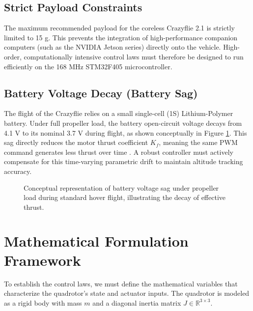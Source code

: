 \subsection{Strict Payload Constraints}
The maximum recommended payload for the coreless Crazyflie 2.1 is strictly limited to 15 g. This prevents the integration of high-performance companion computers (such as the NVIDIA Jetson series) directly onto the vehicle. High-order, computationally intensive control laws must therefore be designed to run efficiently on the 168 MHz STM32F405 microcontroller.

\subsection{Battery Voltage Decay (Battery Sag)}
The flight of the Crazyflie relies on a small single-cell (1S) Lithium-Polymer battery. Under full propeller load, the battery open-circuit voltage decays from 4.1 V to its nominal 3.7 V during flight, as shown conceptually in Figure \ref{fig:battery_sag_response}. This sag directly reduces the motor thrust coefficient $K_f$, meaning the same PWM command generates less thrust over time \cite{ref_40}. A robust controller must actively compensate for this time-varying parametric drift to maintain altitude tracking accuracy.

\begin{figure}[h!]
\centering
{}
\caption{Conceptual representation of battery voltage sag under propeller load during standard hover flight, illustrating the decay of effective thrust.}
\label{fig:battery_sag_response}
\end{figure}

\section{Mathematical Formulation Framework}
To establish the control laws, we must define the mathematical variables that characterize the quadrotor's state and actuator inputs. The quadrotor is modeled as a rigid body with mass $m$ and a diagonal inertia matrix $J \in \mathbb{R}^{3 \times 3}$.

